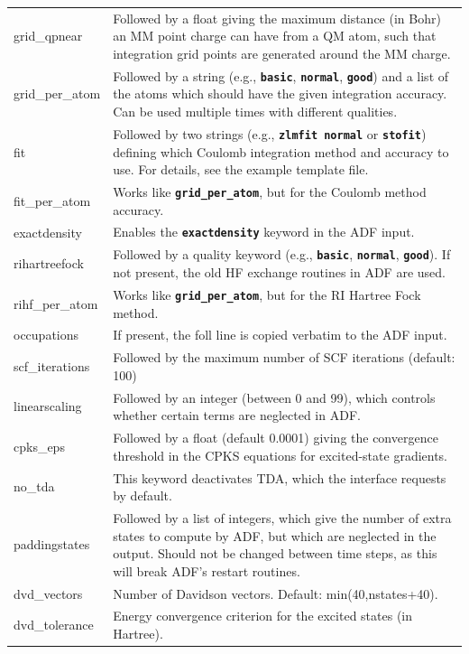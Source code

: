 \documentclass[a4paper,10pt,DIV=15,openany]{scrbook}
\newcommand{\ttt}[1]{\textbf{\texttt{#1}}}
\begin{document}
\begin{table}
\begin{tabular}{>{\ttfamily}lp{12cm}}
\\
grid\_qpnear            &Followed by a float giving the maximum distance (in Bohr) an MM point charge can have from a QM atom, such that integration grid points are generated around the MM charge.
\\
grid\_per\_atom         &Followed by a string (e.g., \ttt{basic}, \ttt{normal}, \ttt{good}) and a list of the atoms which should have the given integration accuracy. Can be used multiple times with different qualities.
\\
fit                     &Followed by two strings (e.g., \ttt{zlmfit normal} or \ttt{stofit}) defining which Coulomb integration method and accuracy to use. For details, see the example template file.
\\
fit\_per\_atom          &Works like \ttt{grid\_per\_atom}, but for the Coulomb method accuracy.
\\
exactdensity            &Enables the \ttt{exactdensity} keyword in the ADF input.
\\
rihartreefock           &Followed by a quality keyword (e.g., \ttt{basic}, \ttt{normal}, \ttt{good}). If not present, the old HF exchange routines in ADF are used.
\\
rihf\_per\_atom         &Works like \ttt{grid\_per\_atom}, but for the RI Hartree Fock method.
\\
occupations             &If present, the foll line is copied verbatim to the ADF input.
\\
scf\_iterations         &Followed by the maximum number of SCF iterations (default: 100)
\\
linearscaling           &Followed by an integer (between 0 and 99), which controls whether certain terms are neglected in ADF.
\\
cpks\_eps               &Followed by a float (default 0.0001) giving the convergence threshold in the CPKS equations for excited-state gradients.
\\
no\_tda                 &This keyword deactivates TDA, which the interface requests by default.
\\
paddingstates           &Followed by a list of integers, which give the number of extra states to compute by ADF, but which are neglected in the output. Should not be changed between time steps, as this will break ADF's restart routines.
\\
dvd\_vectors            &Number of Davidson vectors. Default: min(40,nstates+40).
\\
dvd\_tolerance          &Energy convergence criterion for the excited states (in Hartree).

\end{tabular}
\end{table}
\end{document}

